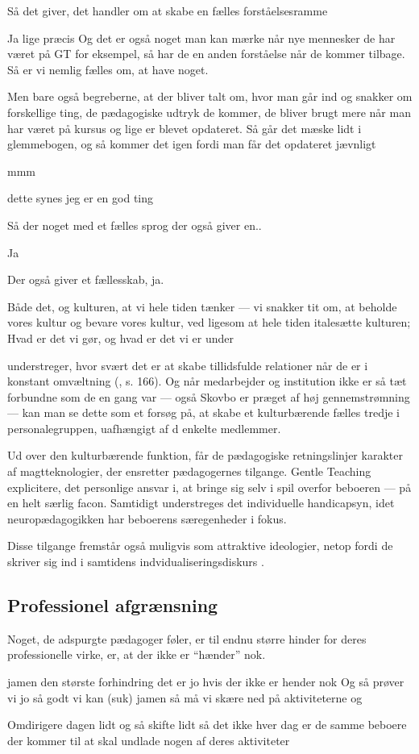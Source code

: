 \begin{description}
\MAA
Så det giver, det handler om at skabe en fælles forståelsesramme

\DMC
Ja lige præcis
Og det er også noget man kan mærke når nye mennesker de har været på GT for eksempel, så har de en anden forståelse når de kommer tilbage.
Så er vi nemlig fælles om, at have noget.

\AMB
Men bare også begreberne, at der bliver talt om, hvor man går ind og snakker om forskellige ting, de pædagogiske udtryk de kommer, de bliver brugt mere når man har været på kursus og lige er blevet opdateret.
Så går det mæske lidt i glemmebogen, og så kommer det igen fordi man får det opdateret jævnligt

\DMC
mmm

\AMB
dette synes jeg er en god ting

\MAA
Så der noget med et fælles sprog der også giver en..

\AMB
Ja

\DMC
Der også giver et fællesskab, ja.

\AMB
Både det, og kulturen, at vi hele tiden tænker — vi snakker tit om, at beholde vores kultur og bevare vores kultur, ved ligesom at hele tiden italesætte kulturen;
Hvad er det vi gør, og hvad er det vi er under 
\end{description}

\citeauthor{baumanLiquidModernity2000} understreger, hvor svært det er at skabe tillidsfulde relationer når de er i konstant omvæltning (\citeyear{baumanLiquidModernity2000}, s. 166).
Og når medarbejder og institution ikke er så tæt forbundne som de en gang var — også Skovbo er præget af høj gennemstrømning — kan man se dette som et forsøg på, at skabe et kulturbærende fælles tredje i personalegruppen,  uafhængigt af d enkelte medlemmer.

Ud over den kulturbærende funktion, får de pædagogiske retningslinjer karakter af magtteknologier, der ensretter pædagogernes tilgange.
Gentle Teaching explicitere, det personlige ansvar i, at bringe sig selv i spil overfor beboeren --- på en helt særlig facon.
Samtidigt understreges det individuelle handicapsyn, idet neuropædagogikken har beboerens særegenheder i fokus.

Disse tilgange fremstår også muligvis som attraktive ideologier, netop fordi de skriver sig ind i samtidens indvidualiseringsdiskurs \autocite{andersenUndervisningInstitutionOg2019}.


\subsection{Professionel afgrænsning}
Noget, de adspurgte pædagoger føler, er til endnu større hinder for deres professionelle virke, er, at der ikke er “hænder” nok.
\begin{description}
\DMC
jamen den største forhindring det er jo hvis der ikke er hender nok
Og så prøver vi jo så godt vi kan (suk)
jamen så må vi skære ned på aktiviteterne og 

\AMB
Omdirigere dagen lidt og så skifte lidt så det ikke hver dag er de samme beboere der kommer til at skal undlade nogen af deres aktiviteter
\end{description}

